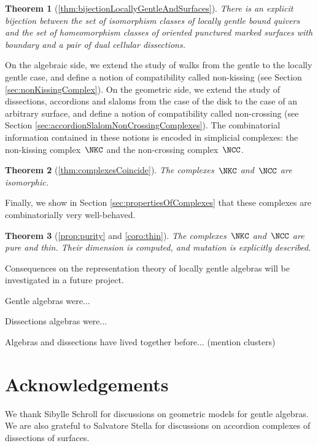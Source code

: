 \documentclass{amsart}
\newtheorem*{theorem*}{Theorem}%
\theoremstyle{definition}
\newcommand{\pierreguy}[1]{\todo[color=green!30]{#1 \\ \hfill --- PG.}}
\begin{document}
\begin{theorem*}[\ref{thm:bijectionLocallyGentleAndSurfaces}]
 There is an explicit bijection between the set of isomorphism classes of locally gentle bound quivers and the set of homeomorphism classes of oriented punctured marked surfaces with boundary and a pair of dual cellular dissections.
\end{theorem*}

On the algebraic side, we extend the study of walks from the gentle to the locally gentle case, and define a notion of compatibility called non-kissing (see Section \ref{sec:nonKissingComplex}).
On the geometric side, we extend the study of dissections, accordions and slaloms from the case of the disk to the case of an arbitrary surface, and define a notion of compatibility called non-crossing (see Section \ref{sec:accordionSlalomNonCrossingComplexes}).
The combinatorial information contained in these notions is encoded in simplicial complexes: the non-kissing complex~$\NKC$ and the non-crossing complex~$\NCC$.

\begin{theorem*}[\ref{thm:complexesCoincide}]
 The complexes~$\NKC$ and~$\NCC$ are isomorphic.
\end{theorem*}

Finally, we show in Section \ref{sec:propertiesOfComplexes} that these complexes are combinatorially very well-behaved.

\begin{theorem*}[\ref{prop:purity} and \ref{coro:thin}]
 The complexes~$\NKC$ and~$\NCC$ are pure and thin.  Their dimension is computed, and mutation is explicitly described.
\end{theorem*}

Consequences on the representation theory of locally gentle algebras will be investigated in a future project.


Gentle algebras were...

Dissections algebras were... 

Algebras and dissections have lived together before... (mention clusters)
\pierreguy{Finish introduction.}

\section*{Acknowledgements}
We thank Sibylle Schroll for discussions on geometric models for gentle algebras.
We are also grateful to Salvatore Stella for discussions on accordion complexes of dissections of surfaces.
\end{document}
